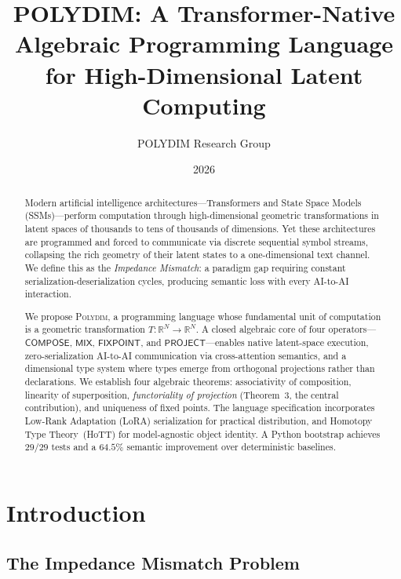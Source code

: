 \documentclass[10pt,twocolumn]{article}
\title{\textbf{POLYDIM: A Transformer-Native Algebraic Programming Language\\
for High-Dimensional Latent Computing}}
\author[1]{POLYDIM Research Group}
\affil[1]{\texttt{ai.mpat.agt@gmail.com}}
\date{2026}
\theoremstyle{plain}
\theoremstyle{definition}
\theoremstyle{remark}
\newcommand{\RR}{\mathbb{R}}
\newcommand{\Compose}{\mathsf{COMPOSE}}
\newcommand{\Mix}{\mathsf{MIX}}
\newcommand{\Fixpoint}{\mathsf{FIXPOINT}}
\newcommand{\Project}{\mathsf{PROJECT}}
\begin{document}

\maketitle

\begin{abstract}
Modern artificial intelligence architectures---Transformers and State Space
Models (SSMs)---perform computation through high-dimensional geometric
transformations in latent spaces of thousands to tens of thousands of
dimensions. Yet these architectures are programmed and forced to communicate
via discrete sequential symbol streams, collapsing the rich geometry of their
latent states to a one-dimensional text channel. We define this as the
\emph{Impedance Mismatch}: a paradigm gap requiring constant
serialization-deserialization cycles, producing semantic loss with every
AI-to-AI interaction.

We propose \textsc{Polydim}, a programming language whose fundamental unit of
computation is a geometric transformation $T\colon \RR^N \to \RR^N$. A closed
algebraic core of four operators---$\Compose$, $\Mix$, $\Fixpoint$, and
$\Project$---enables native latent-space execution, zero-serialization AI-to-AI
communication via cross-attention semantics, and a dimensional type system where
types emerge from orthogonal projections rather than declarations. We establish
four algebraic theorems: associativity of composition, linearity of
superposition, \emph{functoriality of projection} (Theorem~3, the central
contribution), and uniqueness of fixed points. The language specification
incorporates Low-Rank Adaptation (LoRA) serialization for practical
distribution, and Homotopy Type Theory~(HoTT) for model-agnostic object
identity. A Python bootstrap achieves $29/29$ tests and a $64.5\%$ semantic
improvement over deterministic baselines.
\end{abstract}

\section{Introduction}
\label{sec:intro}

\subsection{The Impedance Mismatch Problem}
\end{document}
